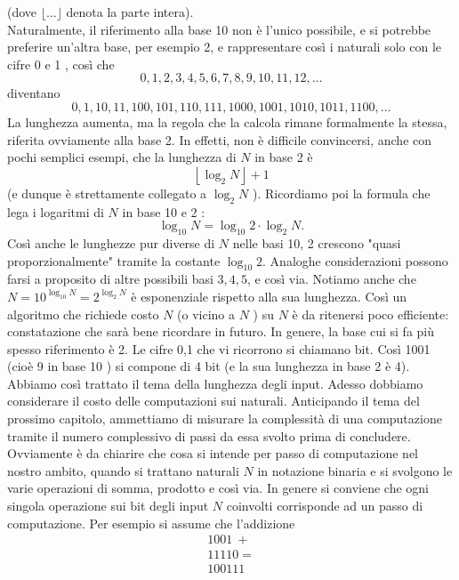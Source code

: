 (dove $\lfloor\ldots\rfloor$ denota la parte intera).\\
Naturalmente, il
riferimento alla base 10 non è l'unico possibile, e si potrebbe preferire
un'altra base, per esempio 2, e rappresentare così i naturali solo con le cifre
0 e 1 , così che
$$
    0,1,2,3,4,5,6,7,8,9,10,11,12, \ldots
$$
diventano
$$
    0,1,10,11,100,101,110,111,1000,1001,1010,1011,1100, \ldots
$$
La lunghezza aumenta, ma la regola che la calcola rimane formalmente la stessa,
riferita ovviamente alla base 2. In effetti, non è difficile convincersi, anche
con pochi semplici esempi, che la lunghezza di $N$ in base 2 è
$$
    \left\lfloor\log _2 N\right\rfloor+1
$$
(e dunque è strettamente collegato a $\log _2 N$ ). Ricordiamo poi la formula
che lega i logaritmi di $N$ in base 10 e 2 :
$$
    \log _{10} N=\log _{10} 2 \cdot \log _2 N .
$$
Così anche le lunghezze pur diverse di $N$ nelle basi 10, 2 crescono "quasi
proporzionalmente" tramite la costante $\log _{10} 2$. Analoghe considerazioni
possono farsi a proposito di altre possibili basi $3,4,5$, e così via. Notiamo
anche che $N=10^{\log _{10} N}=2^{\log _2 N}$ è esponenziale rispetto alla sua
lunghezza. Così un algoritmo che richiede costo $N$ (o vicino a $N$ ) su $N$ è
da ritenersi poco efficiente: constatazione che sarà bene ricordare in futuro.
In genere, la base cui si fa più spesso riferimento è 2. Le cifre 0,1 che vi
ricorrono si chiamano bit. Così 1001 (cioè 9 in base 10 ) si compone di 4 bit (e
la sua lunghezza in base 2 è 4). Abbiamo così trattato il tema della lunghezza
degli input. Adesso dobbiamo considerare il costo delle computazioni sui
naturali. Anticipando il tema del prossimo capitolo, ammettiamo di misurare la
complessità di una computazione tramite il numero complessivo di passi da essa
svolto prima di concludere. Ovviamente è da chiarire che cosa si intende per
passo di computazione nel nostro ambito, quando si trattano naturali $N$ in
notazione binaria e si svolgono le varie operazioni di somma, prodotto e così
via. In genere si conviene che ogni singola operazione sui bit degli input $N$
coinvolti corrisponde ad un passo di computazione. Per esempio si assume che
l'addizione
$$
    \begin{array}{r}
        1001 \ + \\
        11110 =  \\
        \hline
        100111 \ \ \
    \end{array}
$$

